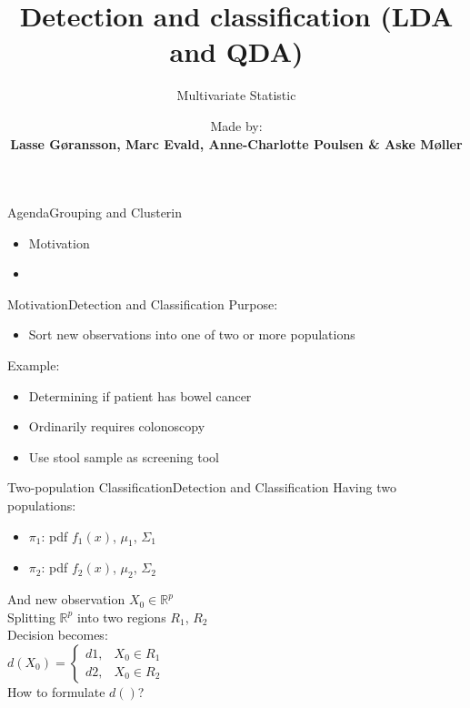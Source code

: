 \documentclass[aspectratio=169,10pt,t]{beamer}
\title{Detection and classification (LDA and QDA)}
\subtitle{Multivariate Statistic}
\date{ }
\author{
	Made by: \\
	\textbf{Lasse Gøransson, Marc Evald, Anne-Charlotte Poulsen \& Aske Møller}
}
\institute[
  SDU Robotics\\
  The Maersk Mc-Kinney Moller Institute\\
  University of Southern Denmark
] %
{%
  SDU Robotics\\
  The Maersk Mc-Kinney Moller Institute\\
  University of Southern Denmark

}
\begin{document}
{\SDUwavesbg%
\begin{frame} %
  \titlepage
\end{frame}}

\begin{frame}{Agenda}{Grouping and Clusterin}{\vphantom{(y}}
\begin{itemize}
    \item Motivation
    \item 
\end{itemize}
\end{frame}

\setcounter{page}{1}
\begin{frame}{Motivation}{Detection and Classification}
    Purpose: 
    \begin{itemize}
        \item Sort new observations into one of two or more populations
    \end{itemize}
    Example:
    \begin{itemize}
        \item Determining if patient has bowel cancer
        \item Ordinarily requires colonoscopy
        \item Use stool sample as screening tool
    \end{itemize}
\end{frame}

\begin{frame}{Two-population Classification}{Detection and Classification}
    Having two populations: \\
    \begin{itemize}
        \item $\pi_1$: pdf $f_1(x)$, $\mu_1$, $\Sigma_1$
        \item $\pi_2$: pdf $f_2(x)$, $\mu_2$, $\Sigma_2$
    \end{itemize}
    And new observation $X_0 \in \mathbb{R}^p$ \\
    Splitting $\mathbb{R}^p$ into two regions $R_1$, $R_2$ \\
    Decision becomes: \\
    \quad $d(X_0) = \begin{cases} d1, &X_0 \in R_1 \\ d2, &X_0 \in R_2 \end{cases}$ \\
    How to formulate $d()$?
\end{frame}
\end{document}
